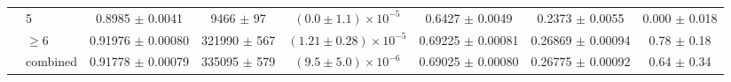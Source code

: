 \begin{table}
\begin{tiny}
\begin{tabular}{llcccccc}
 & 5 & 0.8985 $\pm$ 0.0041 & 9466 $\pm$ 97 & $(0.0 \pm 1.1) \times 10^{-5}$ & 0.6427 $\pm$ 0.0049 & 0.2373 $\pm$ 0.0055 & 0.000 $\pm$ 0.018 \\
 & $\geq 6$ & 0.91976 $\pm$ 0.00080 & 321990 $\pm$ 567 & $(1.21 \pm 0.28) \times 10^{-5}$ & 0.69225 $\pm$ 0.00081 & 0.26869 $\pm$ 0.00094 & 0.78 $\pm$ 0.18 \\
 & combined & 0.91778 $\pm$ 0.00079 & 335095 $\pm$ 579 & $(9.5 \pm 5.0) \times 10^{-6}$ & 0.69025 $\pm$ 0.00080 & 0.26775 $\pm$ 0.00092 & 0.64 $\pm$ 0.34 \\
\hline
\end{tabular}
\end{tiny}
\end{table}

